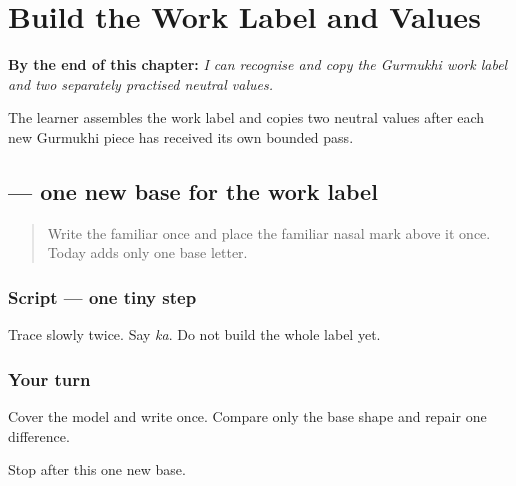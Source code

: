 
\chapter{Build the Work Label and Values}
\label{ch:pa-form-work-runway}

\begin{chapteropening}
\textbf{By the end of this chapter:} \emph{I can recognise and copy the Gurmukhi work label and two separately practised neutral values.}

The learner assembles the work label and copies two neutral values after each new Gurmukhi piece has received its own bounded pass.
\end{chapteropening}

\section[\texorpdfstring{\pa{ਕ} (ka)}{ਕ (ka)}]{ — one new base for the work label}

\label{lesson:PA-W05-ka}



\begin{quote}
Write the familiar \textbf{} once and place the familiar nasal mark \textbf{} above it once. Today adds only one base letter.
\end{quote}

\subsection*{Script — one tiny step}

Trace \textbf{} slowly twice. Say \emph{ka}. Do not build the whole label yet.

\subsection*{Your turn}
Cover the model and write \textbf{} once. Compare only the base shape and repair one difference.

\begin{tcolorbox}[breakable,colback=teal!4,colframe=teal!35!black,title={Before you move on}]
Stop after this one new base.
\end{tcolorbox}
